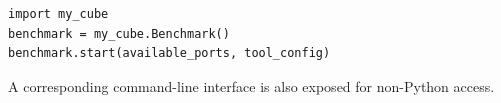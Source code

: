 \documentclass{article}
\theoremstyle{plain}
\theoremstyle{definition}
\theoremstyle{remark}
\begin{document}




\begin{tcolorbox}[
  colback=blue!3,
  colframe=blue!25,
  arc=2mm,
  boxrule=0.5pt,
  left=3mm,
  right=3mm,
  top=2mm,
  bottom=2mm,
  boxsep=0pt
]
\begin{lstlisting}
import my_cube
benchmark = my_cube.Benchmark()
benchmark.start(available_ports, tool_config)
\end{lstlisting}
\end{tcolorbox}


A corresponding command-line interface is also exposed for non-Python access.
\end{document}
